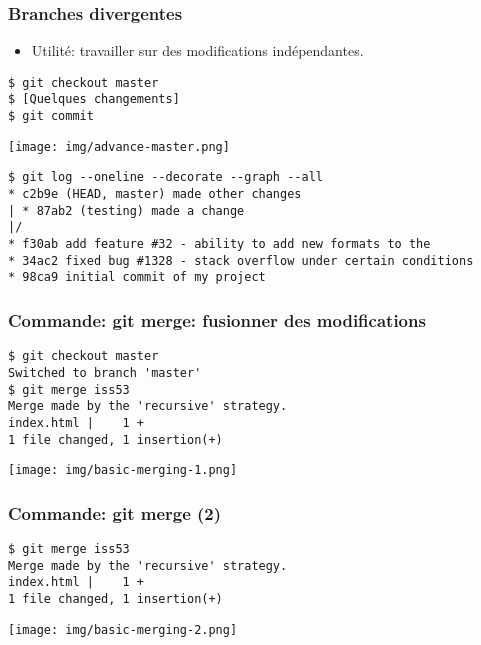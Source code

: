 \documentclass{beamer}
\begin{document}
\begin{frame}[fragile]
    \frametitle{Branches divergentes}
    \begin{itemize}
        \item Utilité: travailler sur des modifications indépendantes.
    \end{itemize}
\begin{lstlisting}
$ git checkout master
$ [Quelques changements]
$ git commit
\end{lstlisting}
    \begin{center}
        \texttt{[image: img/advance-master.png]}
    \end{center}
\end{frame}

\begin{frame}[fragile]
\begin{lstlisting}
$ git log --oneline --decorate --graph --all
* c2b9e (HEAD, master) made other changes
| * 87ab2 (testing) made a change
|/
* f30ab add feature #32 - ability to add new formats to the
* 34ac2 fixed bug #1328 - stack overflow under certain conditions
* 98ca9 initial commit of my project
\end{lstlisting}
\end{frame}

\begin{frame}[fragile]
    \frametitle{Commande: git merge: fusionner des modifications}
\begin{lstlisting}
$ git checkout master
Switched to branch 'master'
$ git merge iss53
Merge made by the 'recursive' strategy.
index.html |    1 +
1 file changed, 1 insertion(+)
\end{lstlisting}
\begin{center}
    \texttt{[image: img/basic-merging-1.png]}
\end{center}
\end{frame}

\begin{frame}[fragile]
    \frametitle{Commande: git merge (2)}
\begin{lstlisting}
$ git merge iss53
Merge made by the 'recursive' strategy.
index.html |    1 +
1 file changed, 1 insertion(+)
\end{lstlisting}
\begin{center}
    \texttt{[image: img/basic-merging-2.png]}
\end{center}
\end{frame}
\end{document}
